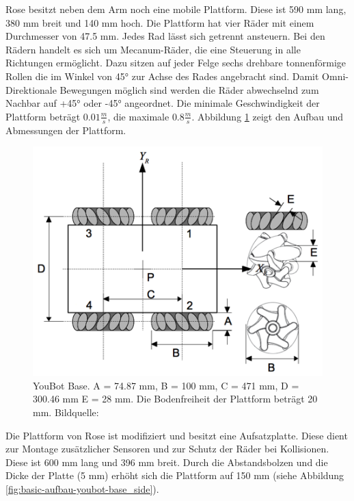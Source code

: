 Rose besitzt neben dem Arm noch eine mobile Plattform. Diese ist 590 mm lang, 380 mm breit und 140 mm hoch. Die Plattform hat vier Räder mit einem Durchmesser von 47.5 mm. Jedes Rad lässt sich getrennt ansteuern. Bei den Rädern handelt es sich um Mecanum-Räder, die eine Steuerung in alle Richtungen ermöglicht. Dazu sitzen auf jeder Felge sechs drehbare tonnenförmige Rollen die im Winkel von 45° zur Achse des Rades angebracht sind. Damit Omni-Direktionale Bewegungen möglich sind werden die Räder abwechselnd zum Nachbar auf +45° oder -45° angeordnet. Die minimale Geschwindigkeit der Plattform beträgt $0.01\frac{m}{s}$, die maximale  $0.8\frac{m}{s}$. Abbildung \ref{fig:basic-aufbau-youbot-base} zeigt den Aufbau und Abmessungen der Plattform. 

\begin{figure}[H]
	\centering
	\includegraphics[scale=0.8]{fig/kukabase}   
	\caption[YouBot Base]{YouBot Base. A = 74.87 mm, B = 100 mm, C = 471 mm, D = 300.46 mm E = 28 mm. Die Bodenfreiheit der Plattform beträgt 20 mm. Bildquelle: \cite{monikaflorekjasinska2015}}
	\label{fig:basic-aufbau-youbot-base}
\end{figure}

Die Plattform von Rose ist modifiziert und besitzt eine Aufsatzplatte. Diese dient zur Montage zusätzlicher Sensoren und zur Schutz der Räder bei Kollisionen. Diese ist 600 mm lang und 396 mm breit. Durch die Abstandsbolzen und die Dicke der Platte (5 mm) erhöht sich die Plattform auf 150 mm (siehe Abbildung \ref{fig:basic-aufbau-youbot-base_side}).  

